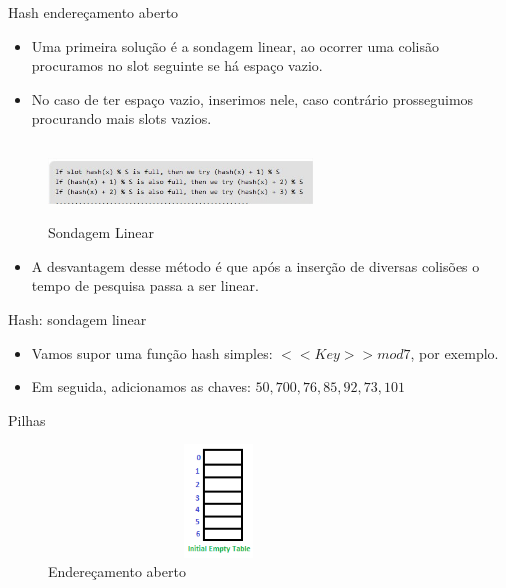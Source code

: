 \begin{frame}
	\begin{block}{Hash endereçamento aberto}
		\begin{itemize}
			\item Uma primeira solução é a sondagem linear, ao ocorrer uma colisão procuramos no slot seguinte se há espaço vazio. 

			\item No caso de ter espaço vazio, inserimos nele, caso contrário prosseguimos procurando mais slots vazios.
		\end{itemize}
		\begin{figure}[!htb]
			\centering	  				
			\includegraphics[height=2cm, width = 7cm]{./pic/sondagemLinearCode.jpg}
			\caption{Sondagem Linear}
			\label{fig_pilha}
		\end{figure}
				
		\begin{itemize}	
			\item A desvantagem desse método é que após a inserção de diversas colisões o tempo de pesquisa passa a ser linear.
		\end{itemize}
	\end{block}
\end{frame}

\begin{frame}
	\begin{block}{Hash: sondagem linear}
		\begin{itemize}
			\item Vamos supor uma função hash simples: $<<Key>> mod 7$, por exemplo. 
			
			\item Em seguida, adicionamos as chaves: $ 50, 700, 76, 85, 92, 73, 101$

		\end{itemize}
	\end{block}
\end{frame}

\begin{frame}
	\begin{block}{Pilhas}
		\begin{figure}[!htb]
			\centering	  				
			\includegraphics[height=3cm, width = 9cm]{./pic/openAddressing11Linear.png}
			\caption{Endereçamento aberto}
			\label{fig_pilha}
		\end{figure}
	\end{block}
\end{frame}

